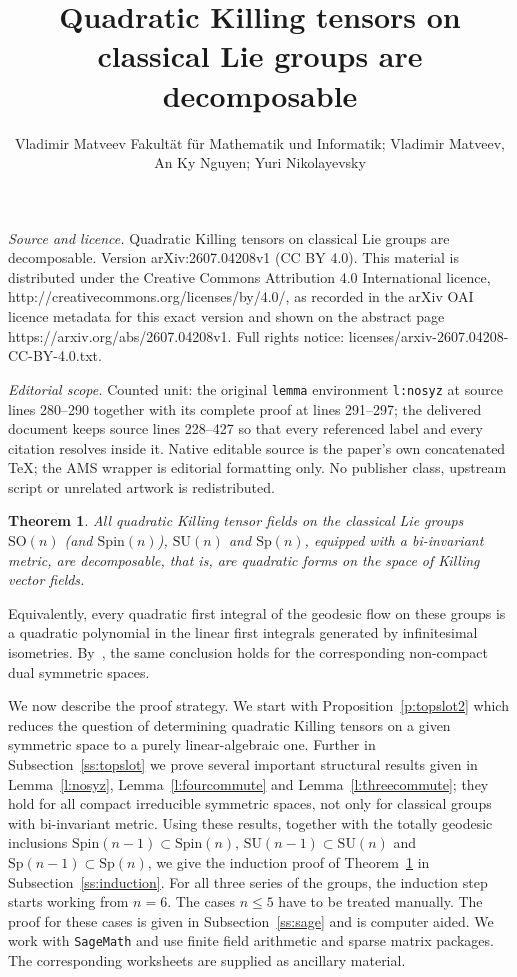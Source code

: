 \documentclass[10pt,a4paper]{amsart}
\newcommand \SO{\mathrm{SO}}
\newcommand \Sp{\mathrm{Sp}}
\newcommand \SU{\mathrm{SU}}
\newcommand \Spin{\mathrm{Spin}}
\newcommand \<{\langle}
\renewcommand \>{\rangle}
\newtheorem{theorem}{Theorem}
\begin{document}
\title[Quadratic Killing tensors on classical Lie groups are decomp]{Quadratic Killing tensors on classical Lie groups are decomposable}
\author{Vladimir Matveev Fakultät für Mathematik und Informatik; Vladimir Matveev, An Ky Nguyen; Yuri Nikolayevsky}
\date{}
\maketitle
\noindent\emph{Source and licence.} Quadratic Killing tensors on classical Lie groups are decomposable. Version arXiv:2607.04208v1 (CC BY 4.0). This material is distributed under the Creative Commons Attribution 4.0 International licence, http://creativecommons.org/licenses/by/4.0/, as recorded in the arXiv OAI licence metadata for this exact version and shown on the abstract page https://arxiv.org/abs/2607.04208v1. Full rights notice: licenses/arxiv-2607.04208-CC-BY-4.0.txt.\par\smallskip
\noindent\textit{Editorial scope.} Counted unit: the original \texttt{lemma} environment \texttt{l:nosyz} at source lines 280--290 together with its complete proof at lines 291--297; the delivered document keeps source lines 228--427 so that every referenced label and every citation resolves inside it. Native editable source is the paper's own concatenated TeX; the AMS wrapper is editorial formatting only. No publisher class, upstream script or unrelated artwork is redistributed.
	\begin{theorem} \label{t:SOSUSp}
		All quadratic Killing tensor fields on the classical Lie groups $\SO(n)$ \emph{(}and $\Spin(n)$\emph{)}, $\SU(n)$ and $\Sp(n)$, equipped with a bi-invariant metric, are decomposable, that is, are quadratic forms on the space of Killing vector fields.
	\end{theorem}
	
	Equivalently, every quadratic first integral of the geodesic flow on these groups is a quadratic polynomial in the linear first integrals generated by infinitesimal isometries. By~\cite[Theorem~2]{MN2}, the same conclusion holds for the corresponding non-compact dual symmetric spaces. 
	
We now describe the proof strategy. We start with Proposition~\ref{p:topslot2} which reduces the question of determining quadratic Killing tensors on a given symmetric space to a purely linear-algebraic one. Further in Subsection~\ref{ss:topslot} we prove several important structural results given in Lemma~\ref{l:nosyz}, Lemma~\ref{l:fourcommute} and Lemma~\ref{l:threecommute}; they hold for all compact irreducible symmetric spaces, not only for classical groups with bi-invariant metric. Using these results, together with the totally geodesic inclusions $\Spin(n-1)\subset\Spin(n), \, \SU(n-1)\subset\SU(n)$ and $\Sp(n-1)\subset\Sp(n)$, we give the induction proof of Theorem~\ref{t:SOSUSp} in Subsection~\ref{ss:induction}. For all three series of the groups, the induction step starts working from $n=6$. The cases $n \le 5$ have to be treated manually. The proof for these cases is given in Subsection~\ref{ss:sage} and is computer aided. We work with \texttt{SageMath} and use finite field arithmetic and sparse matrix packages. The corresponding worksheets are supplied as ancillary material.
	
\end{document}
